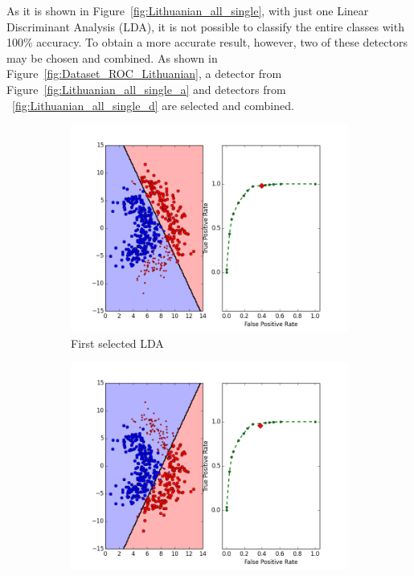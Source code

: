 As it is shown in Figure~\ref{fig:Lithuanian_all_single}, with just one Linear Discriminant Analysis (LDA), it is not possible to classify the entire classes with 100\% accuracy. To obtain a more accurate result, however, two of these detectors may be chosen and combined. As shown in Figure~\ref{fig:Dataset_ROC_Lithuanian}, a detector from Figure~\ref{fig:Lithuanian_all_single_a}  and detectors from ~\ref{fig:Lithuanian_all_single_d} are selected and combined. 

\begin{figure}[H]
    \centering
    \begin{adjustbox}{minipage=\linewidth,scale=1.1}
    \begin{subfigure}[b]{0.5\columnwidth}
        \centering
        \includegraphics[width=\linewidth]{figs/Lithuanian/20Dataset-ROC}
        \caption{First selected LDA}
        \label{fig:Dataset_ROC_Lithuanian_a} 
    \end{subfigure}
    \begin{subfigure}[b]{0.5\columnwidth}
        \centering
        \includegraphics[width=\linewidth]{figs/Lithuanian/65Dataset-ROC}

\end{subfigure}
\end{adjustbox}
\end{figure}
